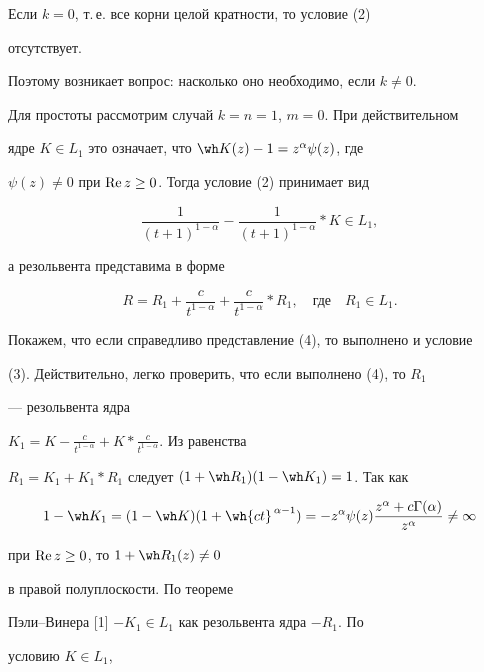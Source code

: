  


Если $k=0$, т.\,е. все корни целой кратности, то условие (2) 


отсутствует. 


Поэтому возникает вопрос: насколько оно необходимо, если $k\ne0$. 


Для простоты рассмотрим случай $k=n=1$, $m=0$. При действительном 


ядре $K\in L_1$ это означает, что $\wh K(z)-1=z^\alpha\psi(z)$, где 


$\psi(z)\ne0$ при $\operatorname{Re} z\ge0$. Тогда условие (2) принимает вид 


\begin{equation} 


\frac{1}{(t+1)^{1-\alpha}}- 


\frac{1}{(t+1)^{1-\alpha}}*K\in L_1, 


\end{equation} 


а резольвента представима в форме 


\begin{equation} 


R=R_1+\frac{c}{t^{1-\alpha}}+\frac{c}{t^{1-\alpha}}*R_1,\quad 


\text{где}\quad 


R_1\in L_1. 


\end{equation} 


Покажем, что если справедливо представление (4), то выполнено и условие 


(3). Действительно, легко проверить, что если выполнено (4), то $R_1$ 


--- резольвента ядра 


$K_1=K-\frac{c}{t^{1-\alpha}}+K*\frac{c}{t^{1-\alpha}}$. Из равенства 


$R_1=K_1+K_1*R_1$ следует $(1+\wh R_1)(1-\wh K_1)=1$. Так как 


$$ 


1-\wh K_1=(1-\wh K)(1+\wh{c t}^{\,\alpha-1})= 


-z^\alpha\psi(z)\frac{z^\alpha+c\Gamma(\alpha)}{z^\alpha} 


\ne\infty 


$$ 


при $\operatorname{Re} z\ge0$, то $1+\wh R_1(z)\ne0$ 


в правой полуплоскости. По теореме 


Пэли--Винера [1]\; $-K_1\in L_1$ как резольвента ядра $-R_1$. По 


условию $K\in L_1$, 



